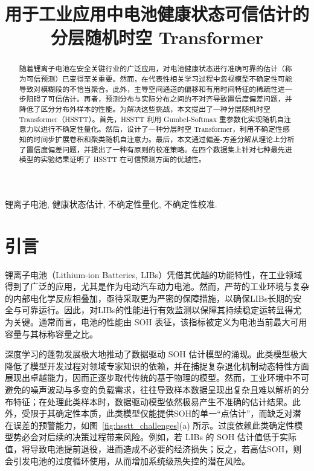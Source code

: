 \documentclass[UTF8,journal,twoside,web]{ieeecolor}
\begin{document}
\title{用于工业应用中电池健康状态可信估计的分层随机时空 Transformer
}
\maketitle
\begin{abstract}
随着锂离子电池在安全关键行业的广泛应用，对电池健康状态进行准确可靠的估计（称为可信预测）已变得至关重要。然而，在代表性相关学习过程中忽视模型不确定性可能导致对模糊段的不恰当聚合。此外，主导空间通道的偏移和有用时间特征的稀疏性进一步阻碍了可信估计。再者，预测分布与实际分布之间的不对齐导致置信度偏差问题，并降低了区分分布外样本的性能。为解决这些挑战，本文提出了一种分层随机时空 Transformer（HSSTT）。首先，HSSTT 利用 Gumbel-Softmax 重参数化实现随机自注意力以进行不确定性量化。然后，设计了一种分层时空 Transformer，利用不确定性感知的时间步扩展卷积和聚类随机自注意力。最后，本文通过偏差-方差分解从理论上分析了置信度偏差问题，并提出了一种有原则的校准策略。在四个数据集上针对七种最先进模型的实验结果证明了 HSSTT 在可信预测方面的优越性。
\end{abstract}

\begin{IEEEkeywords}
锂离子电池, 健康状态估计, 不确定性量化, 不确定性校准.
\end{IEEEkeywords}

\section{引言}\label{sec:introduction}

锂离子电池（Lithium-ion Batteries, LIBs）凭借其优越的功能特性，在工业领域得到了广泛的应用，尤其是作为电动汽车动力电池\cite{NASAJPOURESFAHANI2024114783, hannan2017review}。然而，严苛的工业环境与复杂的内部电化学反应相叠加，亟待采取更为严密的保障措施，以确保LIBs长期的安全与可靠运行。因此，对LIBs的性能进行有效监测以保障其持续稳定运转显得尤为关键。通常而言，电池的性能由 SOH 表征，该指标被定义为电池当前最大可用容量与其标称容量之比\cite{WANG2024110325, 10391265}。

深度学习的蓬勃发展极大地推动了数据驱动 SOH 估计模型的涌现。此类模型极大降低了模型开发过程对领域专家知识的依赖，并在捕捉复杂退化机制动态特性方面展现出卓越能力，因而正逐步取代传统的基于物理的模型\cite{mit_dataset_attia2020closed, tri_dataset_severson2019data, tongji_dataset_zhu2022data}。然而，工业环境中不可避免的噪声波动与多变的负载需求，往往导致样本数据呈现出复杂且难以解析的分布特征；在处理此类样本时，数据驱动模型依然极易产生不准确的估计结果\cite{10214203}。此外，受限于其确定性本质，此类模型仅能提供SOH的单一“点估计”，而缺乏对潜在误差的预警能力，如图~\ref{fig:hsstt_challenges}(a) 所示。过度依赖此类确定性模型势必会对后续的决策过程带来风险。例如，若 LIBs 的 SOH 估计值低于实际值，将导致电池提前退役，进而造成不必要的经济损失；反之，若高估SOH，则会引发电池的过度循环使用，从而增加系统级热失控的潜在风险。
\end{document}
